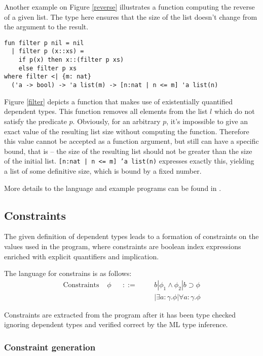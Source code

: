 \documentclass[a4paper,UKenglish]{lipics-v2016}
\begin{document}
Another example on Figure \ref{reverse} illustrates a function computing the
reverse of a given list. The type here ensures that the size of the list
doesn't change from the argument to the result.

\begin{lstlisting}[caption={The filter function for lists},label=filter,captionpos=t,float,abovecaptionskip=-\medskipamount]
fun filter p nil = nil
  | filter p (x::xs) =
    if p(x) then x::(filter p xs)
    else filter p xs
where filter <| {m: nat}
  ('a -> bool) -> 'a list(m) -> [n:nat | n <= m] 'a list(n)
\end{lstlisting}

Figure \ref{filter} depicts a function that makes use of existentially
quantified dependent types. This function removes all elements from the list
$l$ which do not satisfy the predicate $p$. Obviously, for an arbitrary $p$,
it's impossible to give an exact value of the resulting list size without
computing the function. Therefore this value cannot be accepted as a function
argument, but still can have a specific bound, that is -- the size of the
resulting list should not be greater than the size of the initial list.
\texttt{[n:nat | n <= m] 'a list(n)} expresses exactly this, yielding a list of
some definitive size, which is bound by a fixed number.

More details to the language and example programs can be found in
\cite{Xi:1998}\cite{XiPhd:1998}.

\subsection{Constraints}

The given definition of dependent types leads to a formation of constraints on
the values used in the program, where constraints are boolean index expressions
enriched with explicit quantifiers and implication.

The language for constrains is as follows:
\begin{align*}
  \text{Constraints } &\phi &&::= &&&b | \phi_1 \land \phi_2 | b \supset \phi\\
                      &     &&    &&&| \exists a : \gamma. \phi | \forall a : \gamma. \phi
\end{align*}

Constraints are extracted from the program after it has been type checked
ignoring dependent types and verified correct by the ML type inference.

\subsubsection{Constraint generation}
\end{document}
